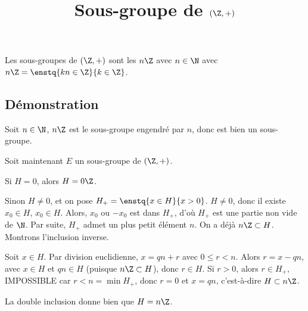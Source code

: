 \documentclass[fontsize=12pt,twoside=false,parskip=half]{scrartcl}
\title{Sous-groupe de $(\Z, +)$}
\date{}
\author{}
\begin{document}
\maketitle
   \begin{Theoreme}
      Les sous-groupes de $(\Z, +)$ sont les $n\Z$ avec $n \in \N$ avec $n\Z = \enstq{kn \in \Z}{k \in \Z}$.
   \end{Theoreme}
   \subsection{Démonstration}
      Soit $n \in \N$, $n\Z$ est le sous-groupe engendré par $n$, donc est bien un sous-groupe.

      Soit maintenant $E$ un sous-groupe de $(\Z, +)$.
      
      Si $H = {0}$, alors $H = 0\Z$.

      Sinon $H \neq {0}$, et on pose $H_+ = \enstq{x \in H}{x > 0}$. $H \neq {0}$, donc il existe $x_0 \in H$, $x_0 \in H$.
      Alors, $x_0$ ou $-x_0$ est dans $H_+$, d’où $H_+$ est une partie non vide de $\N$. Par suite, $H_+$ admet un plus 
      petit élément $n$. On a déjà $n\Z \subset H$. Montrons l’inclusion inverse.
      
      Soit $x \in H$. Par division euclidienne, $x = qn + r$ avec $0 \leq r < n$. Alors $r = x - qn$, avec $x \in H$ et 
      $qn \in H$ (puisque $n\Z \subset H$), donc $r \in H$. Si $r > 0$, alors $r \in H_+$, IMPOSSIBLE car $r < n = \min H_+$,
      donc $r = 0$ et $x = qn$, c’est-à-dire $H \subset n\Z$.
      
      La double inclusion donne bien que $H = n\Z$.
\end{document}
